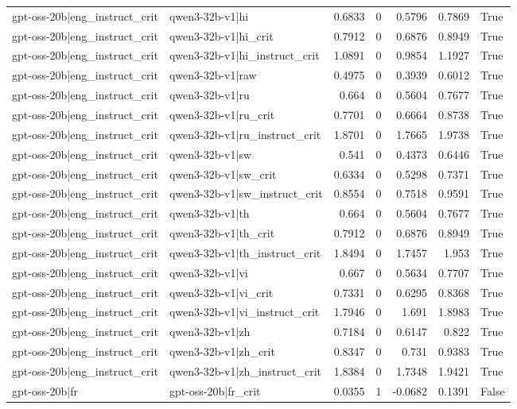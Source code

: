 \begin{table}
\begin{tabular}{l l r r r r l}
gpt-oss-20b|eng_instruct_crit & qwen3-32b-v1|hi & 0.6833 & 0 & 0.5796 & 0.7869 & True \\
gpt-oss-20b|eng_instruct_crit & qwen3-32b-v1|hi_crit & 0.7912 & 0 & 0.6876 & 0.8949 & True \\
gpt-oss-20b|eng_instruct_crit & qwen3-32b-v1|hi_instruct_crit & 1.0891 & 0 & 0.9854 & 1.1927 & True \\
gpt-oss-20b|eng_instruct_crit & qwen3-32b-v1|raw & 0.4975 & 0 & 0.3939 & 0.6012 & True \\
gpt-oss-20b|eng_instruct_crit & qwen3-32b-v1|ru & 0.664 & 0 & 0.5604 & 0.7677 & True \\
gpt-oss-20b|eng_instruct_crit & qwen3-32b-v1|ru_crit & 0.7701 & 0 & 0.6664 & 0.8738 & True \\
gpt-oss-20b|eng_instruct_crit & qwen3-32b-v1|ru_instruct_crit & 1.8701 & 0 & 1.7665 & 1.9738 & True \\
gpt-oss-20b|eng_instruct_crit & qwen3-32b-v1|sw & 0.541 & 0 & 0.4373 & 0.6446 & True \\
gpt-oss-20b|eng_instruct_crit & qwen3-32b-v1|sw_crit & 0.6334 & 0 & 0.5298 & 0.7371 & True \\
gpt-oss-20b|eng_instruct_crit & qwen3-32b-v1|sw_instruct_crit & 0.8554 & 0 & 0.7518 & 0.9591 & True \\
gpt-oss-20b|eng_instruct_crit & qwen3-32b-v1|th & 0.664 & 0 & 0.5604 & 0.7677 & True \\
gpt-oss-20b|eng_instruct_crit & qwen3-32b-v1|th_crit & 0.7912 & 0 & 0.6876 & 0.8949 & True \\
gpt-oss-20b|eng_instruct_crit & qwen3-32b-v1|th_instruct_crit & 1.8494 & 0 & 1.7457 & 1.953 & True \\
gpt-oss-20b|eng_instruct_crit & qwen3-32b-v1|vi & 0.667 & 0 & 0.5634 & 0.7707 & True \\
gpt-oss-20b|eng_instruct_crit & qwen3-32b-v1|vi_crit & 0.7331 & 0 & 0.6295 & 0.8368 & True \\
gpt-oss-20b|eng_instruct_crit & qwen3-32b-v1|vi_instruct_crit & 1.7946 & 0 & 1.691 & 1.8983 & True \\
gpt-oss-20b|eng_instruct_crit & qwen3-32b-v1|zh & 0.7184 & 0 & 0.6147 & 0.822 & True \\
gpt-oss-20b|eng_instruct_crit & qwen3-32b-v1|zh_crit & 0.8347 & 0 & 0.731 & 0.9383 & True \\
gpt-oss-20b|eng_instruct_crit & qwen3-32b-v1|zh_instruct_crit & 1.8384 & 0 & 1.7348 & 1.9421 & True \\
gpt-oss-20b|fr & gpt-oss-20b|fr_crit & 0.0355 & 1 & -0.0682 & 0.1391 & False \\

\end{tabular}
\end{table}
